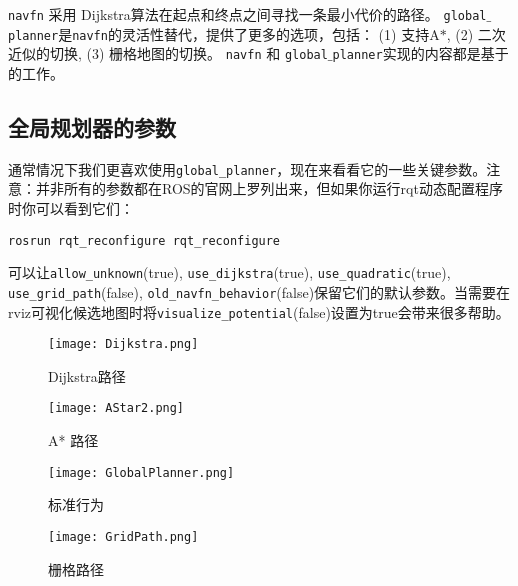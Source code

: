 
\texttt{navfn} 采用 Dijkstra算法在起点和终点之间寻找一条最小代价的路径。
\texttt{global$\_$planner}是\texttt{navfn}的灵活性替代，提供了更多的选项，包括：
(1) 支持A$*$, (2) 二次近似的切换, (3) 栅格地图的切换。
\texttt{navfn} 和 \texttt{global$\_$planner}实现的内容都是基于\cite{brock1999high}的工作。

\subsection[Global Planner Parameters]{全局规划器的参数}

通常情况下我们更喜欢使用\texttt{global\_planner}，现在来看看它的一些关键参数。注意：并非所有的参数都在ROS的官网上罗列出来，但如果你运行rqt动态配置程序时你可以看到它们：
\begin{center}
	\texttt{rosrun rqt\_reconfigure rqt\_reconfigure}
\end{center}
可以让\texttt{allow\_unknown}(true), \texttt{use\_dijkstra}(true), \texttt{use\_quadratic}(true), \texttt{use\_grid\_path}(false), \texttt{old\_navfn\_behavior}(false)保留它们的默认参数。当需要在rviz可视化候选地图时将\texttt{visualize\_potential}(false)设置为true会带来很多帮助。

\begin{figure}[!htb]
	\texttt{[image: Dijkstra.png]}
	\caption{Dijkstra路径}
	\endminipage\hfill
	\texttt{[image: AStar2.png]}
	\caption{A* 路径}
	\endminipage\hfill
\end{figure}

\begin{figure}[!htb]
	\texttt{[image: GlobalPlanner.png]}
	\caption{标准行为}
	\endminipage\hfill
	\texttt{[image: GridPath.png]}
	\caption{栅格路径}
	\endminipage\hfill
\end{figure}


